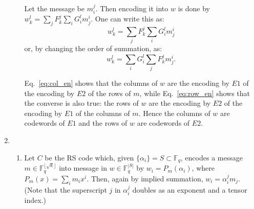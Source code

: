 \documentclass[11pt]{article} \usepackage{amssymb}
\begin{document}
\begin{enumerate}
\begin{enumerate}
Let the message be $m_i^j$. Then encoding it into $w$ is done 
by $w_k^l=\sum_jF_k^j\sum_iG_i^lm_j^i$. One can write this as: 
\begin{equation}
  \label{eq:col_en}
w_k^l=\sum_jF_k^j\sum_iG_i^lm_j^i  
\end{equation}
or, by changing the order of summation, as:
\begin{equation}
  \label{eq:row_en}
w_k^l=\sum_iG_i^l\sum_jF_k^jm_j^i.
\end{equation}

Eq.~\ref{eq:col_en} shows that the columns of $w$ are the encoding by $E1$
of the encoding by $E2$ of the rows of $m$, while 
Eq.~\ref{eq:row_en} shows that the converse is also true: the rows of $w$
are the encoding by $E2$ of the encoding by $E1$ of the columns of $m$. 
Hence the columns of $w$ are codewords of $E1$ and the rows of $w$ 
are codewords of $E2$. 
\end{enumerate}
\item
\begin{enumerate}
\item
Let $C$ be the RS code which, given $\{\alpha_i\}=S\subset \mathbb{F}_q$, encodes a message  
$m\in \mathbb{F}_q^{\lfloor\sqrt{k}\rfloor}$ into message in $w\in \mathbb{F}_q^{|S|}$ by $w_{i}=P_m(\alpha_i)$, where 
$P_m(x)=\sum_im_ix^i$. Then, again by implied summation, $w_i=\alpha_i^jm_j$. (Note that
the superscript $j$ in $\alpha_i^j$ doubles as an exponent and a
tensor index.)


\end{enumerate}
\end{enumerate}
\end{document}
